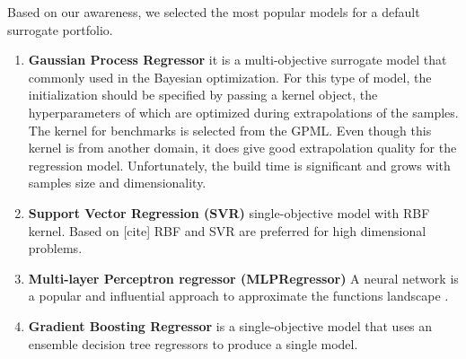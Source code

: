 
    Based on our awareness, we selected the most popular models for a default surrogate portfolio.
    \begin{enumerate}
        \item \textbf{Gaussian Process Regressor} it is a multi-objective surrogate model that commonly used in the Bayesian optimization. For this type of model, the initialization should be specified by passing a kernel object, the hyperparameters of which are optimized during extrapolations of the samples.  The kernel for benchmarks is selected from the GPML\cite{RasmussenN10}. Even though this kernel is from another domain, it does give good extrapolation quality for the regression model. Unfortunately, the build time is significant and grows with samples size and dimensionality.
        \item \textbf{Support Vector Regression (SVR)} single-objective model with RBF kernel. Based on [cite] RBF and SVR are preferred for high dimensional problems.
        \item \textbf{Multi-layer Perceptron regressor (MLPRegressor)} A neural network is a popular and influential approach to approximate the functions landscape \cite{KOURAKOS201313}.
        \item \textbf{Gradient Boosting Regressor} is a single-objective model that uses an ensemble decision tree regressors to produce a single model.
    \end{enumerate}
    
